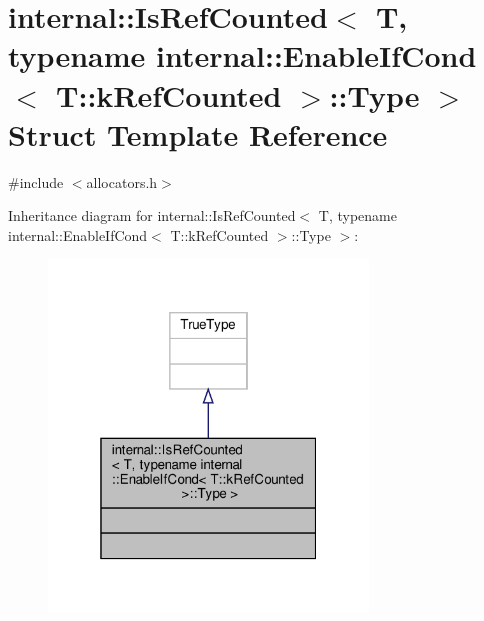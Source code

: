 \hypertarget{structinternal_1_1IsRefCounted_3_01T_00_01typename_01internal_1_1EnableIfCond_3_01T_1_1kRefCounted_01_4_1_1Type_01_4}{}\section{internal\+:\+:Is\+Ref\+Counted$<$ T, typename internal\+:\+:Enable\+If\+Cond$<$ T\+:\+:k\+Ref\+Counted $>$\+:\+:Type $>$ Struct Template Reference}
\label{structinternal_1_1IsRefCounted_3_01T_00_01typename_01internal_1_1EnableIfCond_3_01T_1_1kRefCounted_01_4_1_1Type_01_4}


{\ttfamily \#include $<$allocators.\+h$>$}



Inheritance diagram for internal\+:\+:Is\+Ref\+Counted$<$ T, typename internal\+:\+:Enable\+If\+Cond$<$ T\+:\+:k\+Ref\+Counted $>$\+:\+:Type $>$\+:
\nopagebreak
\begin{figure}[H]
\begin{center}
\leavevmode
\includegraphics[width=241pt]{structinternal_1_1IsRefCounted_3_01T_00_01typename_01internal_1_1EnableIfCond_3_01T_1_1kRefCount6026047545006f6259980d8b57fca119}
\end{center}
\end{figure}


